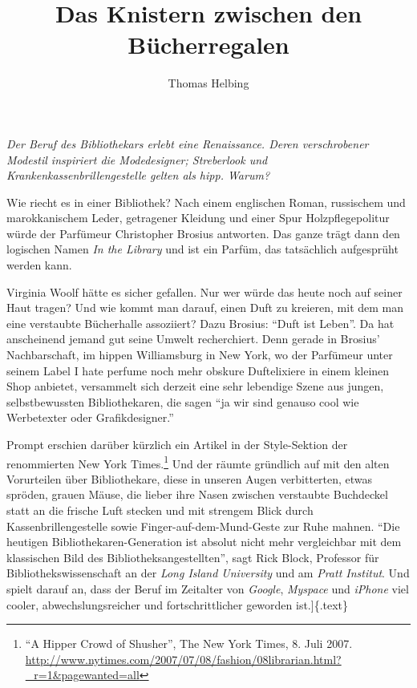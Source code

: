 \documentclass[output=paper]{langscibook}
\title{Das Knistern zwischen den Bücherregalen}
\author{Thomas Helbing}
\begin{document}
\maketitle
\noindent \emph{Der Beruf des Bibliothekars erlebt eine Renaissance. Deren
verschrobener Modestil inspiriert die Modedesigner; Streberlook und
Krankenkassenbrillengestelle gelten als hipp. Warum?}

\vspace{2.5}

\noindent Wie riecht es in einer Bibliothek? Nach einem englischen Roman,
russischem und marokkanischem Leder, getragener Kleidung und einer Spur
Holzpflegepolitur würde der Parfümeur Christopher Brosius antworten. Das
ganze trägt dann den logischen Namen \emph{In the Library} und ist ein
Parfüm, das tatsächlich aufgesprüht werden kann.

Virginia Woolf hätte es sicher gefallen. Nur wer würde das heute noch
auf seiner Haut tragen? Und wie kommt man darauf, einen Duft zu
kreieren, mit dem man eine verstaubte Bücherhalle assoziiert? Dazu
Brosius: ``Duft ist Leben''. Da hat anscheinend jemand gut seine Umwelt
recherchiert. Denn gerade in Brosius' Nachbarschaft, im hippen
Williamsburg in New York, wo der Parfümeur unter seinem Label I hate
perfume noch mehr obskure Duftelixiere in einem kleinen Shop anbietet,
versammelt sich derzeit eine sehr lebendige Szene aus jungen,
selbstbewussten Bibliothekaren, die sagen ``ja wir sind genauso cool wie
Werbetexter oder Grafikdesigner.''

Prompt erschien darüber kürzlich ein Artikel in der Style-Sektion der
renommierten New York Times.\footnote{``A Hipper Crowd of Shusher'', The
  New York Times, 8. Juli 2007.
  \url{http://www.nytimes.com/2007/07/08/fashion/08librarian.html?_r=1\&pagewanted=all}}
Und der räumte gründlich auf mit den alten Vorurteilen über
Bibliothekare, diese in unseren Augen verbitterten, etwas spröden,
grauen Mäuse, die lieber ihre Nasen zwischen verstaubte Buchdeckel statt
an die frische Luft stecken und mit strengem Blick durch
Kassenbrillengestelle sowie Finger-auf-dem-Mund-Geste zur Ruhe mahnen.
``Die heutigen Bibliothekaren-Generation ist absolut nicht mehr
vergleichbar mit dem klassischen Bild des Bibliotheksangestellten'',
sagt Rick Block, Professor für Bibliothekswissenschaft an der \emph{Long
Island University} und am \emph{Pratt Institut}. Und spielt darauf an,
dass der Beruf im Zeitalter von \emph{Google}, \emph{Myspace} und
\emph{iPhone} viel cooler, abwechslungsreicher und fortschrittlicher
geworden ist.{]}\{.text\}
\end{document}
